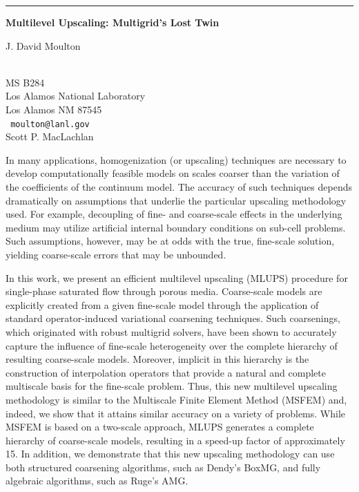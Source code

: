 \documentclass[twosided]{report}
\begin{document}
\begin{center}

\rule{6in}{1pt}
\end{center}

\begin{center}
{\large			\label{moulton}
{\bf
Multilevel Upscaling: Multigrid's Lost Twin
}

J. David Moulton} \\
MS B284 \\
Los Alamos National Laboratory \\
Los Alamos NM 87545
\\ {\tt
moulton@lanl.gov
}
\\
Scott P. MacLachlan
\end{center}

In many applications, homogenization (or upscaling) techniques are
necessary to develop computationally feasible models on scales coarser
than the variation of the coefficients of the continuum model. The
accuracy of such techniques depends dramatically on assumptions that
underlie the particular upscaling methodology used. For example,
decoupling of fine- and coarse-scale effects in the underlying medium
may utilize artificial internal boundary conditions on sub-cell
problems. Such assumptions, however, may be at odds with the true,
fine-scale solution, yielding coarse-scale errors that may be
unbounded.

In this work, we present an efficient multilevel upscaling (MLUPS)
procedure for single-phase saturated flow through porous media.
Coarse-scale models are explicitly created from a given fine-scale
model through the application of standard operator-induced variational
coarsening techniques. Such coarsenings, which originated with robust
multigrid solvers, have been shown to accurately capture the influence
of fine-scale heterogeneity over the complete hierarchy of resulting
coarse-scale models. Moreover, implicit in this hierarchy is the
construction of interpolation operators that provide a natural and
complete multiscale basis for the fine-scale problem. Thus, this new
multilevel upscaling methodology is similar to the Multiscale Finite
Element Method (MSFEM) and, indeed, we show that it attains similar
accuracy on a variety of problems. While MSFEM is based on a two-scale
approach, MLUPS generates a complete hierarchy of coarse-scale models,
resulting in a speed-up factor of approximately 15. In addition, we
demonstrate that this new upscaling methodology can use both structured
coarsening algorithms, such as Dendy's BoxMG, and fully algebraic
algorithms, such as Ruge's AMG.
\end{document}
